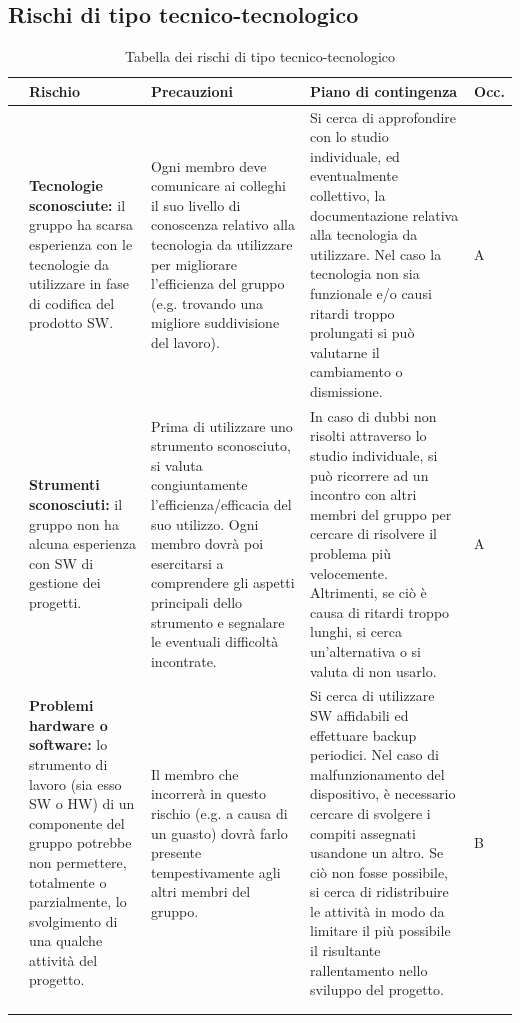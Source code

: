 \subsection{Rischi di tipo tecnico-tecnologico}\label{sec:analisi_rischi:tec}
\renewcommand{\arraystretch}{1.5}
\begin{xltabular}{\textwidth}{p{0.00001\textwidth} X | X | X | p{0.05\textwidth}}
    & \textbf{\color{white} Rischio} & \textbf{\color{white} Precauzioni} & \textbf{\color{white} Piano di contingenza} & \textbf{\color{white} Occ.}\\ 
    \hline
    \endhead
    
    & \textbf{Tecnologie sconosciute:} il gruppo ha scarsa esperienza con le tecnologie da utilizzare in fase di codifica del prodotto SW. 
    & Ogni membro deve comunicare ai colleghi il suo livello di conoscenza relativo alla tecnologia da utilizzare per migliorare l'efficienza del gruppo (e.g. trovando una migliore suddivisione del lavoro).
    & Si cerca di approfondire con lo studio individuale, ed eventualmente collettivo, la documentazione relativa alla tecnologia da utilizzare. Nel caso la tecnologia non sia funzionale e/o causi ritardi troppo prolungati si può valutarne il cambiamento o dismissione. 
    & A \\
    \hline
    
    & \textbf{Strumenti sconosciuti:} il gruppo non ha alcuna esperienza con SW di gestione dei progetti. 
    & Prima di utilizzare uno strumento sconosciuto, si valuta congiuntamente l'efficienza/efficacia del suo utilizzo. Ogni membro dovrà poi esercitarsi a comprendere gli aspetti principali dello strumento e segnalare le eventuali difficoltà incontrate.
    & In caso di dubbi non risolti attraverso lo studio individuale, si può ricorrere ad un incontro con altri membri del gruppo per cercare di risolvere il problema più velocemente. Altrimenti, se ciò è causa di ritardi troppo lunghi, si cerca un'alternativa o si valuta di non usarlo. 
    & A \\
    \hline

    & \textbf{Problemi hardware o software:} lo strumento di lavoro (sia esso SW o HW) di un componente del gruppo potrebbe non permettere, totalmente o parzialmente, lo svolgimento di una qualche attività del progetto. 
    & Il membro che incorrerà in questo rischio (e.g. a causa di un guasto) dovrà farlo presente tempestivamente agli altri membri del gruppo.
    & Si cerca di utilizzare SW affidabili ed effettuare backup periodici. Nel caso di malfunzionamento del dispositivo, è necessario cercare di svolgere i compiti assegnati usandone un altro. Se ciò non fosse possibile, si cerca di ridistribuire le attività in modo da limitare il più possibile il risultante rallentamento nello sviluppo del progetto.
    & B \\
    \hline \\

    \caption{Tabella dei rischi di tipo tecnico-tecnologico}
    \label{tab:rischi:tec}
\end{xltabular}

